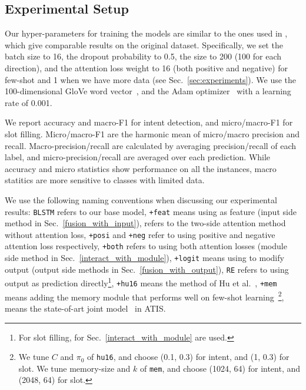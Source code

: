 \subsection{Experimental Setup}
Our hyper-parameters for training the \NN models are similar to the ones used in \cite{liu2016attention}, which give comparable results on
the original dataset. Specifically, we set the batch size to 16, the dropout probability to 0.5, the \BLSTM size to 200 (100 for each
direction), and the attention loss weight to 16 (both positive and negative) for few-shot and 1 when we have more data (see
Sec.~\ref{sec:experiments}). We use the 100-dimensional GloVe word vector~\cite{pennington2014glove}, and the Adam optimizer~\cite{kingma2014adam} with a learning rate of 0.001.

We report accuracy and macro-F1 for intent detection, and micro/macro-F1 for slot filling.
Micro/macro-F1 are the harmonic mean of micro/macro precision and recall.
Macro-precision/recall are calculated by averaging precision/recall of each label, and micro-precision/recall are averaged over each prediction.
While accuracy and micro statistics show performance on all the instances, macro statitics are more sensitive to classes with limited data.

We use the following naming conventions when discussing our experimental results:
%
\texttt{BLSTM} refers to our base model,
\texttt{+feat} means using \REtag as feature (input side method in Sec.~\ref{fusion_with_input}),
\ptatt refers to the two-side attention method without attention loss,
\texttt{+posi} and \texttt{+neg} refer to using positive and negative attention loss respectively, \texttt{+both} refers to using both attention losses (\NN module side method in Sec.~\ref{interact_with_module}),
\texttt{+logit} means using \REtag to modify \NN output (output side methods in Sec.~\ref{fusion_with_output}),
\texttt{RE} refers to using \RE output as prediction directly\footnote{
For slot filling, \REs for Sec.~\ref{interact_with_module} are used.},
\texttt{+hu16} means the method of Hu et al.~,
\texttt{+mem} means adding the memory module that performs well on few-shot learning~\cite{kaiser2017learning}\footnote{
We tune $C$ and $\pi_0$ of \texttt{hu16}, and choose (0.1, 0.3) for intent, and (1, 0.3) for slot. We tune memory-size and $k$ of \texttt{mem}, and choose (1024, 64) for intent, and (2048, 64) for slot.
},
\LL means the state-of-art joint model~\cite{liu2016attention} in ATIS.
